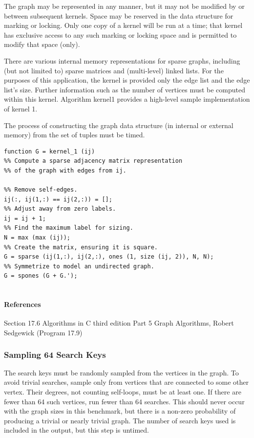 \documentclass{article}
\begin{document}
The graph may be represented in any manner, but it may not be modified by or between subsequent kernels. Space may be reserved in the data structure for marking or locking. Only one copy of a kernel will be run at a time; that kernel has exclusive access to any such marking or locking space and is permitted to modify that space (only).

There are various internal memory representations for sparse graphs, including (but not limited to) sparse matrices and (multi-level) linked lists. For the purposes of this application, the kernel is provided only the edge list and the edge list's size. Further information such as the number of vertices must be computed within this kernel. Algorithm kernel1 provides a high-level sample implementation of kernel 1.

The process of constructing the graph data structure (in internal or external memory) from the set of tuples must be timed.

\begin{lstlisting}
function G = kernel_1 (ij)
%% Compute a sparse adjacency matrix representation
%% of the graph with edges from ij.

%% Remove self-edges.
ij(:, ij(1,:) == ij(2,:)) = [];
%% Adjust away from zero labels.
ij = ij + 1;
%% Find the maximum label for sizing.
N = max (max (ij));
%% Create the matrix, ensuring it is square.
G = sparse (ij(1,:), ij(2,:), ones (1, size (ij, 2)), N, N);
%% Symmetrize to model an undirected graph.
G = spones (G + G.');


\end{lstlisting}

\paragraph*{References}

Section 17.6 Algorithms in C third edition Part 5 Graph Algorithms, Robert Sedgewick (Program 17.9)

\subsubsection*{Sampling 64 Search Keys}

The search keys must be randomly sampled from the vertices in the graph. To avoid trivial searches, sample only from vertices that are connected to some other vertex. Their degrees, not counting self-loops, must be at least one. If there are fewer than 64 such vertices, run fewer than 64 searches. This should never occur with the graph sizes in this benchmark, but there is a non-zero probability of producing a trivial or nearly trivial graph. The number of search keys used is included in the output, but this step is untimed.
\end{document}
